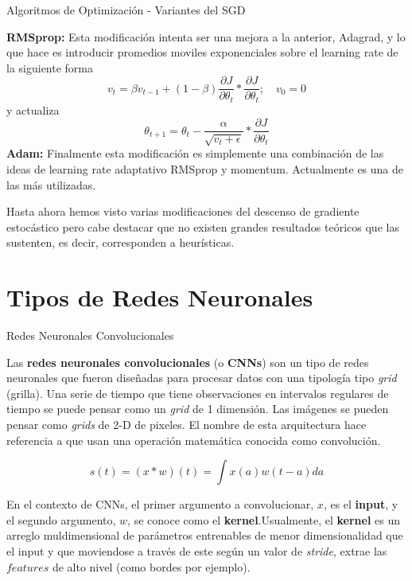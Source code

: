 \documentclass[9pt]{beamer}
\begin{document}
\begin{frame}{Algoritmos de Optimización - Variantes del SGD}

\textbf{RMSprop: } Esta modificación intenta ser una mejora a la anterior, Adagrad, y lo que hace es introducir promedios moviles exponenciales sobre el learning rate de la siguiente forma \pause
\[
v_t = \beta v_{t-1} + (1-\beta)\frac{\partial J}{\partial \theta_t} * \frac{\partial J}{\partial \theta_t} ; \quad v_0 = 0
\] \pause
y actualiza 
\[
\theta_{t+1} = \theta_t - \frac{\alpha}{\sqrt{v_t + \epsilon}} * \frac{\partial J}{\partial \theta_t}
\] \pause 
\textbf{Adam: } Finalmente esta modificación es simplemente una combinación de las ideas de  learning rate adaptativo RMSprop y momentum. Actualmente es una de las más utilizadas. \pause

\vspace{0.2cm}

\begin{observacion}
Hasta ahora hemos visto varias modificaciones del descenso de gradiente estocástico pero cabe destacar que no existen grandes resultados teóricos que las sustenten, es decir, corresponden a heurísticas.
\end{observacion}

\end{frame}

\section{Tipos de Redes Neuronales}

\begin{frame}{Redes Neuronales Convolucionales}

Las \textbf{redes neuronales convolucionales} (o \textbf{CNNs}) son un tipo de redes neuronales que fueron diseñadas para procesar datos con una tipología tipo \textit{grid} (grilla). Una serie de tiempo que tiene observaciones en intervalos regulares de tiempo se puede pensar como un \textit{grid} de 1 dimensión. Las imágenes se pueden pensar como \textit{grids} de 2-D de pixeles. El nombre de esta arquitectura hace referencia a que usan una operación matemática conocida como convolución. \pause 

\begin{equation*}
s(t) = (x * w)(t) = \int x(a)w(t-a)da
\end{equation*} \pause 

En el contexto de CNNs, el primer argumento a convolucionar, $x$, es el \textbf{input}, y el segundo argumento, $w$, se conoce como el \textbf{kernel}.\pause Usualmente, el \textbf{kernel} es un arreglo muldimensional de parámetros entrenables de menor dimensionalidad que el input y que moviendose a través de este según un valor de \textit{stride}, extrae las $\textit{features}$ de alto nivel (como bordes por ejemplo). 

\end{frame}
\end{document}
